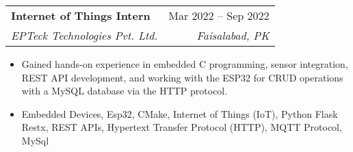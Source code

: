 \documentclass[letterpaper,11pt]{article}
\makeatletter
\newcommand{\resumeItem}[1]{
  \item\small{
    {#1 \vspace{-2pt}}
  }
}
\newcommand{\resumeSubheading}[4]{
  \vspace{-2pt}\item
    \begin{tabular*}{0.97\textwidth}[t]{l@{\extracolsep{\fill}}r}
      \textbf{#1} & #2 \\
      \textit{\small#3} & \textit{\small #4} \\
    \end{tabular*}\vspace{-7pt}
}
\newcommand{\resumeItemListStart}{\begin{itemize}}
\newcommand{\resumeItemListEnd}{\end{itemize}\vspace{-5pt}}
\makeatother
\begin{document}
\resumeSubheading  
{Internet of Things Intern}{Mar 2022 -- Sep 2022}
{EPTeck Technologies Pvt. Ltd.}{Faisalabad, PK}
\resumeItemListStart
\resumeItem{Gained hands-on experience in embedded C programming, sensor integration, REST API development, and working with the ESP32 for CRUD operations with a MySQL database via the HTTP protocol.}
\resumeItem{Embedded Devices, Esp32, CMake, Internet of Things (IoT), Python Flask Restx, REST APIs, Hypertext Transfer Protocol (HTTP), MQTT Protocol,  MySql}
\resumeItemListEnd


\end{document}
